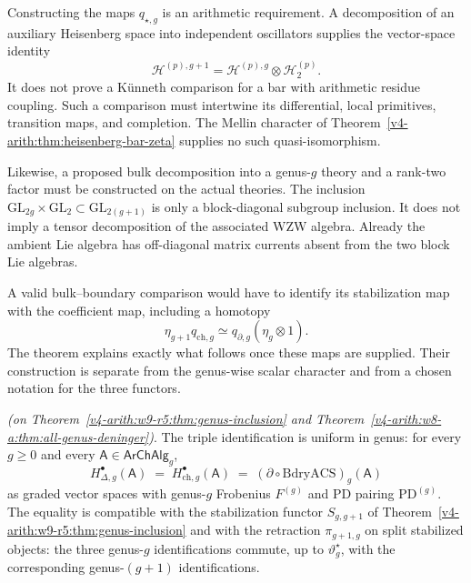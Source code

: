 Constructing the maps \(q_{\star,g}\) is an arithmetic requirement.
A decomposition of an auxiliary Heisenberg space into independent
oscillators supplies the vector-space identity
\[
 \mathcal H^{(p),g+1}
   =\mathcal H^{(p),g}\otimes\mathcal H^{(p)}_2.
\]
It does not prove a K\"unneth comparison for a bar with arithmetic
residue coupling. Such a comparison must intertwine its differential,
local primitives, transition maps, and completion. The Mellin character
of Theorem~\ref{v4-arith:thm:heisenberg-bar-zeta} supplies no such
quasi-isomorphism.

Likewise, a proposed bulk decomposition into a genus-\(g\) theory and
a rank-two factor must be constructed on the actual theories.
The inclusion \(\mathrm{GL}_{2g}\times\mathrm{GL}_2
\subset\mathrm{GL}_{2(g+1)}\) is only a block-diagonal subgroup
inclusion. It does not imply a tensor decomposition of the associated
WZW algebra. Already the ambient Lie algebra has off-diagonal matrix
currents absent from the two block Lie algebras.

A valid bulk--boundary comparison would have to identify its
stabilization map with the coefficient map, including a homotopy
\[
 \eta_{g+1}q_{\mathrm{ch},g}
 \simeq q_{\partial,g}(\eta_g\otimes1).
\]
The theorem explains exactly what follows once these maps are supplied.
Their construction is separate from the genus-wise scalar character
and from a chosen notation for the three functors.

\begin{theorem}
\label{v4-arith:w9-r5:thm:genus-uniformity}
\ClaimStatusProvedHereConditional \emph{(on
Theorem~\ref{v4-arith:w9-r5:thm:genus-inclusion} and
Theorem~\ref{v4-arith:w8-a:thm:all-genus-deninger})}. The triple
identification is uniform in genus: for every \(g\geq 0\) and every
\(\mathsf{A}\in\mathsf{ArChAlg}_{g}\),
\begin{equation}
\label{v4-arith:w9-r5:eq:genus-uniform}
H^{\bullet}_{\Delta,g}(\mathsf{A})
\;=\;H^{\bullet}_{\mathrm{ch},g}(\mathsf{A})
\;=\;(\partial\circ\mathrm{BdryACS})_{g}(\mathsf{A})
\end{equation}
as graded vector spaces with genus-\(g\) Frobenius \(F^{(g)}\) and PD
pairing \(\mathrm{PD}^{(g)}\). The equality is compatible with the
stabilization functor \(S_{g,g+1}\) of
Theorem~\ref{v4-arith:w9-r5:thm:genus-inclusion} and with the retraction
\(\pi_{g+1,g}\) on split stabilized objects: the three genus-\(g\)
identifications commute, up to \(\vartheta^{\star}_{g}\), with the
corresponding genus-\((g+1)\) identifications.
\end{theorem}

